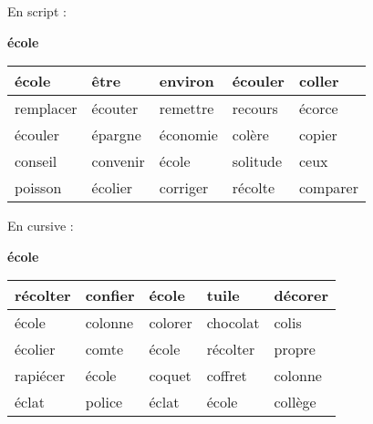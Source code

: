 \documentclass[a4paper, 11pt,oneside, fleqn]{article}
\begin{document}
\begin{onehalfspace}
\large\noindent En script :
\begin{center} {\huge \textbf{école}}
\vspace{0.25cm}\\
\begin{tabulary}{17cm}{|h|h|h|h|h|}
\hline
école & être & environ & écouler & coller \\
\hline
remplacer & écouter & remettre & recours & écorce \\
\hline
écouler & épargne & économie & colère & copier \\
\hline
conseil & convenir & école & solitude & ceux \\
\hline
poisson & écolier & corriger & récolte & comparer \\
\hline
\end{tabulary}
\end{center}
\vspace{0.5cm}

\large\noindent En cursive :
\begin{center}
{\huge \textbf {{\cursive école}}}
\vspace{0.25cm}\\
\begin{tabulary}{17cm}{|i|i|i|i|i|}
\hline
récolter & confier & école & tuile & décorer \\
\hline
école & colonne & colorer & chocolat & colis \\
\hline
écolier & comte & école & récolter & propre \\
\hline
rapiécer & école & coquet & coffret & colonne \\
\hline
éclat & police & éclat & école & collège \\
\hline
\end{tabulary}
\end{center}

\end{onehalfspace}
\end{document}
